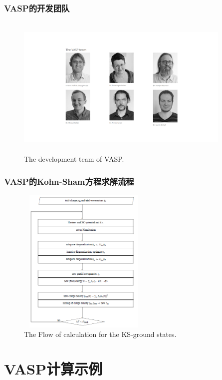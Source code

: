 \frame
{
	\frametitle{\textrm{VASP}的开发团队}
\begin{figure}[h!]
\centering
\vspace*{-0.25in}
\includegraphics[height=2.70in,width=4.05in,viewport=330 130 1280 770,clip]{Figures/VASP_team.png}
\caption{\tiny \textrm{The development team of VASP.}}%
\label{VASP_team}
\end{figure}
}

\frame
{
	\frametitle{\textrm{VASP}的\textrm{Kohn-Sham}方程求解流程}
\begin{figure}[h!]
	\vspace{-0.2in}
\centering
\includegraphics[height=2.75in,width=2.5in,viewport=0 0 480 630,clip]{Figures/VASP_procedure.png}
\caption{\tiny \textrm{The Flow of calculation for the KS-ground states.}}%
\label{PAW_baiseset}
\end{figure} 
}

\section{\rm{VASP}计算示例}
